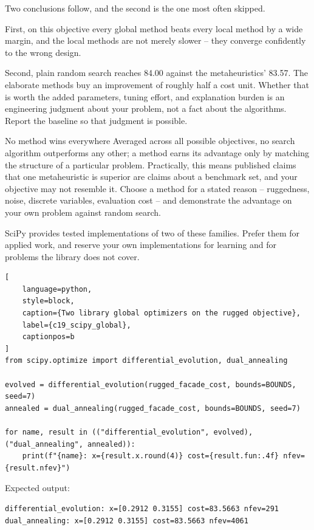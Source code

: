 Two conclusions follow, and the second is the one most often skipped.

First, on this objective every global method beats every local method by a wide
margin, and the local methods are not merely slower -- they converge confidently
to the wrong design.

Second, plain random search reaches 84.00 against the metaheuristics' 83.57. The
elaborate methods buy an improvement of roughly half a cost unit. Whether that
is worth the added parameters, tuning effort, and explanation burden is an
engineering judgment about your problem, not a fact about the algorithms. Report
the baseline so that judgment is possible.

\begin{ExplainBox}{No method wins everywhere}
Averaged across all possible objectives, no search algorithm outperforms any
other; a method earns its advantage only by matching the structure of a
particular problem. Practically, this means published claims that one
metaheuristic is superior are claims about a benchmark set, and your objective
may not resemble it. Choose a method for a stated reason -- ruggedness, noise,
discrete variables, evaluation cost -- and demonstrate the advantage on your own
problem against random search.
\end{ExplainBox}


SciPy provides tested implementations of two of these families. Prefer them for
applied work, and reserve your own implementations for learning and for
problems the library does not cover.

\begin{lstlisting}[
    language=python,
    style=block,
    caption={Two library global optimizers on the rugged objective},
    label={c19_scipy_global},
    captionpos=b
]
from scipy.optimize import differential_evolution, dual_annealing

evolved = differential_evolution(rugged_facade_cost, bounds=BOUNDS, seed=7)
annealed = dual_annealing(rugged_facade_cost, bounds=BOUNDS, seed=7)

for name, result in (("differential_evolution", evolved), ("dual_annealing", annealed)):
    print(f"{name}: x={result.x.round(4)} cost={result.fun:.4f} nfev={result.nfev}")
\end{lstlisting}

Expected output:

\begin{lstlisting}[language=text, style=block, caption={Library global optimizers find the same design at different costs}, label={c19_scipy_output}, captionpos=b]
differential_evolution: x=[0.2912 0.3155] cost=83.5663 nfev=291
dual_annealing: x=[0.2912 0.3155] cost=83.5663 nfev=4061
\end{lstlisting}

